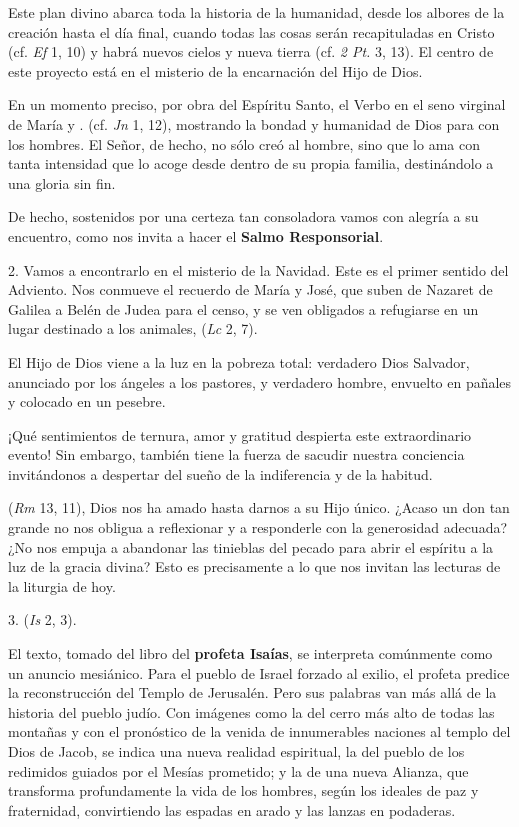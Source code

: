 \begin{body}
\begin{body}
		Este plan divino abarca toda la historia de la humanidad, desde los albores de la creación hasta el día final, cuando todas las cosas serán recapituladas en Cristo (cf. \emph{Ef} 1, 10) y habrá nuevos cielos y nueva tierra (cf. \emph{2 Pt.} 3, 13). El centro de este proyecto está en el misterio de la encarnación del Hijo de Dios.

		En un momento preciso, por obra del Espíritu Santo, el Verbo  en el seno virginal de María y . (cf. \emph{Jn} 1, 12), mostrando la bondad y humanidad de Dios para con los hombres. El Señor, de hecho, no sólo creó al hombre, sino que lo ama con tanta intensidad que lo acoge desde dentro de su propia familia, destinándolo a una gloria sin fin.

		De hecho, sostenidos por una certeza tan consoladora vamos con alegría a su encuentro, como nos invita a hacer el \textbf{Salmo Responsorial}.

		2. Vamos a encontrarlo en el misterio de la Navidad. Este es el primer sentido del Adviento. Nos conmueve el recuerdo de María y José, que suben de Nazaret de Galilea a Belén de Judea para el censo, y se ven obligados a refugiarse en un lugar destinado a los animales,  (\emph{Lc} 2, 7).

		El Hijo de Dios viene a la luz en la pobreza total: verdadero Dios Salvador, anunciado por los ángeles a los pastores, y verdadero hombre, envuelto en pañales y colocado en un pesebre.

		¡Qué sentimientos de ternura, amor y gratitud despierta este extraordinario evento! Sin embargo, también tiene la fuerza de sacudir nuestra conciencia invitándonos a despertar del sueño de la indiferencia y de la habitud.

		 (\emph{Rm} 13, 11), Dios nos ha amado hasta darnos a su Hijo único. ¿Acaso un don tan grande no nos obligua a reflexionar y a responderle con la generosidad adecuada? ¿No nos empuja a abandonar las tinieblas del pecado para abrir el espíritu a la luz de la gracia divina? Esto es precisamente a lo que nos invitan las lecturas de la liturgia de hoy.

		3.  (\emph{Is} 2, 3).

		El texto, tomado del libro del \textbf{profeta Isaías}, se interpreta comúnmente como un anuncio mesiánico. Para el pueblo de Israel forzado al exilio, el profeta predice la reconstrucción del Templo de Jerusalén. Pero sus palabras van más allá de la historia del pueblo judío. Con imágenes como la del cerro más alto de todas las montañas y con el pronóstico de la venida de innumerables naciones al templo del Dios de Jacob, se indica una nueva realidad espiritual, la del pueblo de los redimidos guiados por el Mesías prometido; y la de una nueva Alianza, que transforma profundamente la vida de los hombres, según los ideales de paz y fraternidad, convirtiendo las espadas en arado y las lanzas en podaderas.


\end{body}
\end{body}
